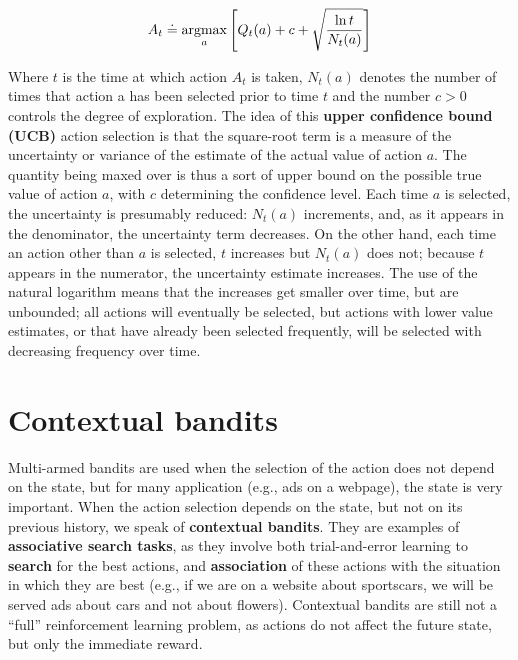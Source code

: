 \begin{equation}
    A_t \doteq \operatorname*{argmax}_a \Bigg[ Q_t (a) + c + \sqrt{\frac{\ln{t}}{N_t (a)}} \Bigg]
    \label{eq:ch3-upperconfidenceboundactionselection}
\end{equation}

Where $t$ is the time at which action $A_t$ is taken, $N_t (a)$ denotes the number of times that action a has been selected prior to time $t$ and the number $c > 0$ controls the degree of exploration. The idea of this \textbf{upper confidence bound (UCB)} action selection is that the square-root term is a measure of the uncertainty or variance of the estimate of the actual value of action $a$. The quantity being maxed over is thus a sort of upper bound on the possible true value of action $a$, with $c$ determining the confidence level. Each time $a$ is selected, the uncertainty is presumably reduced: $N_t (a)$ increments, and, as it appears in the denominator, the uncertainty term decreases. On the other hand, each time an action other than $a$ is selected, $t$ increases but $N_t (a)$ does not; because $t$ appears in the numerator, the uncertainty estimate increases. The use of the natural logarithm means that the increases get smaller over time, but are unbounded; all actions will eventually be selected, but actions with lower value estimates, or that have already been selected frequently, will be selected with decreasing frequency over time.

\section{Contextual bandits}
Multi-armed bandits are used when the selection of the action does not depend on the state, but for many application (e.g., ads on a webpage), the state is very important. When the action selection depends on the state, but not on its previous history, we speak of \textbf{contextual bandits}. They are examples of \textbf{associative search tasks}, as they involve both trial-and-error learning to \textbf{search} for the best actions, and \textbf{association} of these actions with the situation in which they are best (e.g., if we are on a website about sportscars, we will be served ads about cars and not about flowers). Contextual bandits are still not a ``full'' reinforcement learning problem, as actions do not affect the future state, but only the immediate reward.